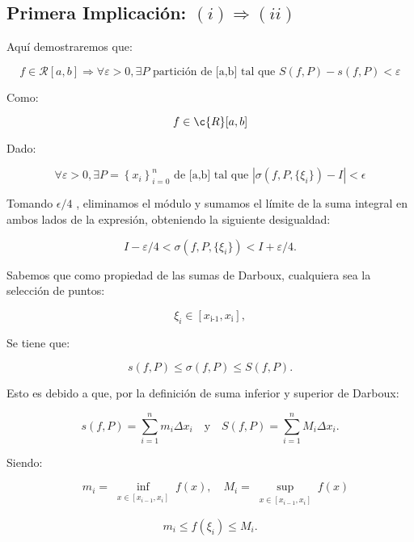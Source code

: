 \documentclass[a4paper,12pt]{article}
\begin{document}
	\subsection{Primera Implicación: $ (i) \Rightarrow (ii) $ }


	Aquí demostraremos que:
	
	
	
	\[
	f \in \mathcal{R}[a,b] \Rightarrow \forall \varepsilon > 0, \exists P \text{ partición de [a,b] tal que  }   S(f,P) - s(f,P) < \varepsilon 
	\]
	
	
	
	Como:
	
	\[
	f \in \c{R}[a,b] 
	\]
	
	Dado:
	
	\[
	\forall \varepsilon > 0, \exists P = \left\{ x_i \right\}_{i=0}^{n}  \text{ de [a,b] tal que  } \left| \sigma(f, P, \{\xi_i\}) - I \right| < \epsilon 
	\]
	
	Tomando $\epsilon/4$ , eliminamos el módulo y sumamos el límite de la suma integral en ambos lados de la expresión, obteniendo la siguiente desigualdad:
	
	
	
	\[
	I - \varepsilon/4 < \sigma(f, P, \{\xi_i\}) < I + \varepsilon/4.
	\]
	
	
	
	Sabemos que como propiedad de las sumas de Darboux, cualquiera sea la selección de puntos:
	
	
	
	\[
	\xi_i \in [x_{\text{i-1}},x_{\text{i}}],
	\]
	
	
	
	Se tiene que:
	
	
	
	\[
	s(f, P) \leq \sigma(f, P) \leq S(f, P).
	\]
	
	
	
	Esto es debido a que, por la definición de suma inferior y superior de Darboux:
	
	
	
	\[
	s(f, P) = \sum_{i=1}^{n} m_i \Delta x_i \quad \text{y} \quad S(f,P) = \sum_{i=1}^{n} M_i \Delta x_i.
	\]
	
	
	
	Siendo: 
	
	\[
	\quad m_i = \inf_{\substack{x \in [x_{i-1}, x_i]}} f(x), \quad
	M_i = \sup_{\substack{x \in [x_{i-1}, x_i]}} f(x)
	\]
	
	
	
	\[
	m_i \leq f(\xi_i) \leq M_i.
	\]
	
\end{document}
